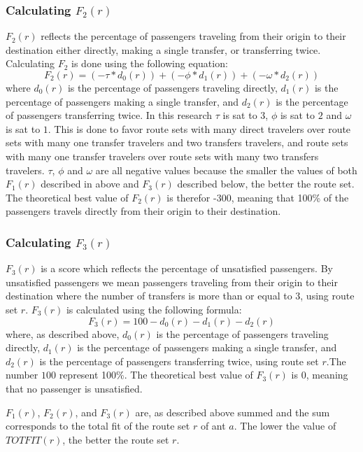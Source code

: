 \subsubsection*{Calculating $F_{2}(r)$}
\label{sec:f2}
$F_{2}(r)$ reflects the percentage of passengers traveling from their origin to their destination either directly, making a single transfer, or transferring twice. Calculating $F_{2}$ is done using the following equation: 
\newline
$$F_2(r) = (-\tau*d_0(r)) + (-\phi*d_1(r)) + (-\omega*d_2(r))$$
\newline
where $d_0(r)$ is the percentage of passengers traveling directly, $d_1(r)$ is the percentage of passengers making a single transfer, and $d_2(r)$ is the percentage of passengers transferring twice. In this research $\tau$ is sat to $3$, $\phi$ is sat to $2$ and $\omega$ is sat to $1$. This is done to favor route sets with many direct travelers over route sets with many one transfer travelers and two transfers travelers, and route sets with many one transfer travelers over route sets with many two transfers travelers. $\tau$, $\phi$ and $\omega$ are all negative values because the smaller the values of both $F_{1}(r)$ described in above and $F_{3}(r)$ described below, the better the route set. The theoretical best value of $F_{2}(r)$ is therefor -300, meaning that 100\% of the passengers travels directly from their origin to their destination. 

\subsubsection*{Calculating $F_{3}(r)$}
\label{sec:f3}
$F_3(r)$ is a score which reflects the percentage of unsatisfied passengers. By unsatisfied passengers we mean passengers traveling from their origin to their destination where the number of transfers is more than or equal to 3, using route set $r$. $F_3(r)$ is calculated using the following formula:
\newline
$$F_3(r) = 100 - d_0(r) - d_1(r) - d_2(r)$$
\newline
where, as described above, $d_0(r)$ is the percentage of passengers traveling directly, $d_1(r)$ is the percentage of passengers making a single transfer, and $d_2(r)$ is the percentage of passengers transferring twice, using route set $r$.The number $100$ represent 100\%. The theoretical best value of $F_3(r)$ is 0, meaning that no passenger is unsatisfied. 

$F_{1}(r)$, $F_{2}(r)$, and $F_{3}(r)$ are, as described above summed and the sum corresponds to the total fit of the route set $r$ of ant $a$. The lower the value of $TOTFIT(r)$, the better the route set $r$. 

